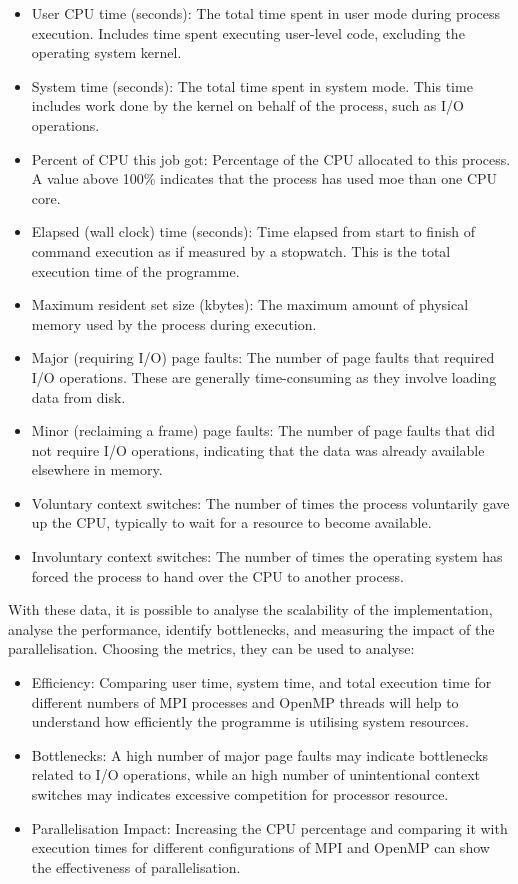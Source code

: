 \documentclass[
]{article}
\begin{document}
\begin{itemize}
\item
  User CPU time (seconds): The total time spent in user mode during
  process execution. Includes time spent executing user-level code,
  excluding the operating system kernel.
\item
  System time (seconds): The total time spent in system mode. This time
  includes work done by the kernel on behalf of the process, such as I/O
  operations.
\item
  Percent of CPU this job got: Percentage of the CPU allocated to this
  process. A value above 100\% indicates that the process has used moe
  than one CPU core.
\item
  Elapsed (wall clock) time (seconds): Time elapsed from start to finish
  of command execution as if measured by a stopwatch. This is the total
  execution time of the programme.
\item
  Maximum resident set size (kbytes): The maximum amount of physical
  memory used by the process during execution.
\item
  Major (requiring I/O) page faults: The number of page faults that
  required I/O operations. These are generally time-consuming as they
  involve loading data from disk.
\item
  Minor (reclaiming a frame) page faults: The number of page faults that
  did not require I/O operations, indicating that the data was already
  available elsewhere in memory.
\item
  Voluntary context switches: The number of times the process
  voluntarily gave up the CPU, typically to wait for a resource to
  become available.
\item
  Involuntary context switches: The number of times the operating system
  has forced the process to hand over the CPU to another process.
\end{itemize}

With these data, it is possible to analyse the scalability of the
implementation, analyse the performance, identify bottlenecks, and
measuring the impact of the parallelisation. Choosing the metrics, they
can be used to analyse:

\begin{itemize}
\item
  Efficiency: Comparing user time, system time, and total execution time
  for different numbers of MPI processes and OpenMP threads will help to
  understand how efficiently the programme is utilising system
  resources.
\item
  Bottlenecks: A high number of major page faults may indicate
  bottlenecks related to I/O operations, while an high number of
  unintentional context switches may indicates excessive competition for
  processor resource.
\item
  Parallelisation Impact: Increasing the CPU percentage and comparing it
  with execution times for different configurations of MPI and OpenMP
  can show the effectiveness of parallelisation.
\end{itemize}
\end{document}

